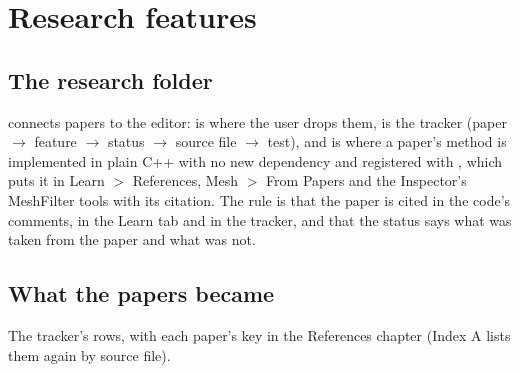 \chapter{Research features}
\label{ch:research}

\section{The research folder}
 connects papers to the editor:  is where the user drops them,  is the
tracker (paper $\to$ feature $\to$ status $\to$ source file $\to$ test), and  is where a paper's
method is implemented in plain C++ with no new dependency and registered with , which
puts it in Learn $>$ References, Mesh $>$ From Papers and the Inspector's MeshFilter tools with its citation. The rule
is that the paper is cited in the code's comments, in the Learn tab and in the tracker, and that the status says what
was taken from the paper and what was not.

\section{What the papers became}
The tracker's rows, with each paper's key in the References chapter (Index A lists them again by source file).

